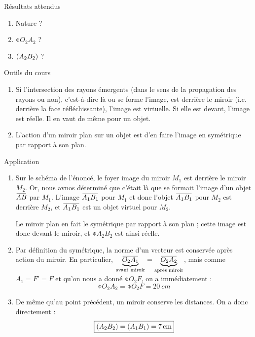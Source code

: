 \documentclass[10pt,a5paper,notitlepage]{book}
\begin{document}
\begin{NCprop}{Résultats attendus}
    \begin{enumerate}
        \item Nature ?
        \item $\obar{O_2A_2}$ ?
        \item $\left(A_2B_2\right)$ ?
    \end{enumerate}
\end{NCprop}

\begin{NCdemo}{Outils du cours}
    \begin{enumerate}
        \item Si l'intersection des rayons émergents (dans le sens de la
            propagation des rayons ou non), c'est-à-dire là ou se forme l'image,
            est derrière le miroir (i.e. derrière la face réfléchissante),
            l'image est virtuelle. Si elle est devant, l'image est réelle. Il en
            vaut de même pour un objet.
        \item L'action d'un miroir plan sur un objet est d'en faire l'image en
            symétrique par rapport à son plan.
    \end{enumerate}
\end{NCdemo}

\begin{NCexem}{Application}
    \begin{enumerate}
        \item Sur le schéma de l'énoncé, le foyer image du miroir $M_1$ est
            derrière le miroir $M_2$. Or, nous avnos déterminé que c'était là
            que se formait l'image d'un objet $\ABb$ par $M_1$. L'image $\ABa$
            pour $M_1$ et donc l'objet $\ABa$ pour $M_2$ est derrière $M_2$, et
            $\ABa$ est un objet virtuel pour $M_2$.

            Le miroir plan en fait le symétrique par rapport à son plan ;
            cette image est donc devant le miroir, et $\obar{A_2B_2}$ est ainsi
            réelle.

        \item Par définition du symétrique, la norme d'un vecteur est conservée
            après action du miroir. En particulier,
            $\underbrace{\obar{O_2A_1}}\St{avant miroir} =
            \underbrace{\obar{O_2A_2}}\St{après miroir}$, mais comme $A_1 = F' =
            F$ et qu'on nous a donné $\obar{O_2F}$, on a immédiatement :
            \[ \boxed{\obar{O_2A_2}= \obar{O_2F} = \SI{20}{cm}} \]

        \item De même qu'au point précédent, un miroir conserve les distances.
            On a donc directement :
            \[ \boxed{ \left(A_2B_2\right) = \left(A_1B_1\right) = \SI{7}{cm}} \]
    \end{enumerate}
\end{NCexem}
\end{document}
